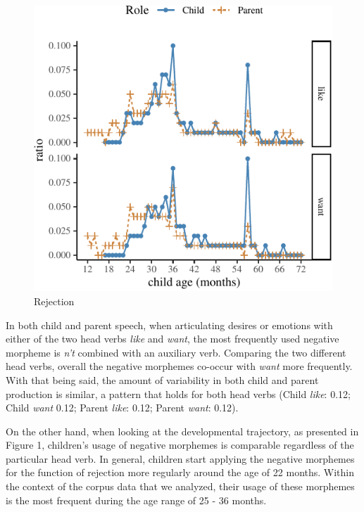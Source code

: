 \documentclass[10pt, letterpaper]{article}
\newenvironment{CodeChunk}{}{}
\begin{document}
\begin{CodeChunk}
\begin{figure}[H]

{\centering \includegraphics{figs/emotion-1} 

}

\caption[Rejection]{Rejection}\label{fig:emotion}
\end{figure}
\end{CodeChunk}

In both child and parent speech, when articulating desires or emotions
with either of the two head verbs \emph{like} and \emph{want}, the most
frequently used negative morpheme is \emph{n't} combined with an
auxiliary verb. Comparing the two different head verbs, overall the
negative morphemes co-occur with \emph{want} more frequently. With that
being said, the amount of variability in both child and parent
production is similar, a pattern that holds for both head verbs (Child
\emph{like}: 0.12; Child \emph{want} 0.12; Parent \emph{like}: 0.12;
Parent \emph{want}: 0.12).

On the other hand, when looking at the developmental trajectory, as
presented in Figure 1, children's usage of negative morphemes is
comparable regardless of the particular head verb. In general, children
start applying the negative morphemes for the function of rejection more
regularly around the age of 22 months. Within the context of the corpus
data that we analyzed, their usage of these morphemes is the most
frequent during the age range of 25 - 36 months.
\end{document}
